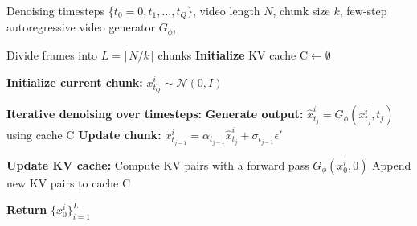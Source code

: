\begin{algorithm}[t]
\small 
\caption{\label{alg:inference}Inference Procedure with KV Caching} 
\begin{algorithmic}[1]
\Require Denoising timesteps $\{t_0=0, t_1, \dots, t_Q \}$, video length $N$, chunk size $k$, few-step autoregressive video generator $G_{\phi}$, 

\State Divide frames into $L = \lceil N / k \rceil$ chunks
\State \textbf{Initialize} KV cache $\text{C} \gets \emptyset$

    \State \textbf{Initialize current chunk:} $x_{t_Q}^{i} \sim \mathcal{N}(0, I)$
    
    \State \textbf{Iterative denoising over timesteps:}
        \State \textbf{Generate output:} $\hat{x}_{t_j}^{i} = G_{\phi}(x_{t_j}^{i}, t_j)$ using cache $\text{C}$
        \State \textbf{Update chunk:} $x_{t_{j-1}}^{i} = \alpha_{t_{j-1}} \hat{x}_{t_j}^{i} + \sigma_{t_{j-1}} \epsilon'$ %
    \EndFor
    
    \State \textbf{Update KV cache:}
    \State Compute KV pairs with a forward pass $G_{\phi}(x_{0}^{i}, 0)$
    \State Append new KV pairs to cache $\text{C}$
\EndFor

\State \textbf{Return} $\{ x_{0}^{i} \}_{i=1}^{L}$
\end{algorithmic}
\end{algorithm}





    


    



